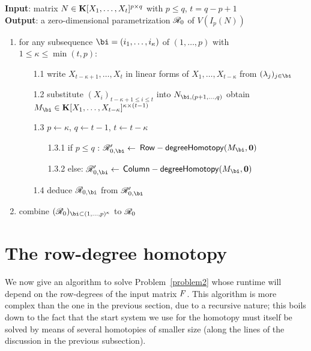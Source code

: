 \documentclass[12pt]{article}
\begin{document}
\begin{algorithm}
\caption{$\mathsf{StartRow}$}
{\bf Input}: 
matrix $N \in \mathbf{K}[X_1, \ldots, X_t]^{p \times q}$ with $p \leq q$, $t = q-p+1$\\
{\bf Output}: a zero-dimensional parametrization $\mathscr{R}_0$ of $V(I_p(N))$
\begin{enumerate}
\item for any subsequence $\bi = (i_1, \ldots, i_\kappa)$ of $(1, \ldots, p)$ with $1 \leq \kappa \leq\min(t,p)$: 
\begin{enumerate}
\item[1.1] write $X_{t-\kappa+1}, \ldots, X_t$ in linear forms of $X_1, \ldots, X_{t-\kappa}$ from $(\lambda_j)_{j \in \bi}$%
\item[1.2] substitute $(X_i)_{t-\kappa+1 \leq i \leq t}$ into $N_{\bi,(p+1, \ldots, q)}$ obtain $M_{\bi} \in \KK[X_1, \ldots, X_{t-\kappa}]^{\kappa \times (t-1)}$
\item[1.3] $p \gets \kappa$, $q \gets t-1$, $t \gets t-\kappa$
\begin{enumerate}
\item[1.3.1] if $p \leq q$ : $\scrR_{0,\bi}' \gets$ $\mathsf{Row-degreeHomotopy}(M_{\bi},\mathbf{0})$
\item[1.3.2] else:  $\scrR_{0,\bi}' \gets$ $\mathsf{Column-degreeHomotopy}(M_{\bi},\mathbf{0})$
\end{enumerate}
\item[1.4] deduce $\scrR_{0,\bi}$ from $\scrR_{0,\bi}'$
\end{enumerate}
\item combine $(\scrR_0)_{{\bi} \subset (1, \ldots,p)^\kappa}$ to $\mathscr{R}_0$
\end{enumerate}
\label{Row}
\end{algorithm}




\section{The row-degree homotopy}\label{sec:rowdegree}

We now give an algorithm to solve Problem~\ref{problem2} whose runtime
will depend on the row-degrees of the input matrix ${F}$. This
algorithm is more complex than the one in the previous section, due to
a recursive nature; this boils down to the fact that the start system
we use for the homotopy must itself be solved by means of several
homotopies of smaller size (along the lines of the discussion in the 
previous subsection).
\end{document}
